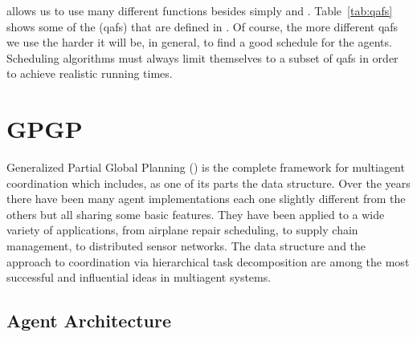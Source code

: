 \taems{} allows us to use many different functions besides simply
 and . Table~\ref{tab:qafs} shows some of the
 (qafs) that are defined in
\taems{}. Of course, the more different qafs we use the harder it
will be, in general, to find a good schedule for the agents.
Scheduling algorithms must always limit themselves to a subset of
qafs in order to achieve realistic running times.

\section{GPGP}

Generalized Partial Global Planning () is the complete framework
for multiagent coordination which includes, as one of its parts the
\taems{} data structure. Over the years there have been many 
agent implementations each one slightly different from the others but
all sharing some basic features.  They have been applied to a wide
variety of applications, from airplane repair scheduling, to supply
chain management, to distributed sensor networks. The \taems{} data
structure and the  approach to coordination via hierarchical task
decomposition are among the most successful and influential ideas in
multiagent systems.

\subsection{Agent Architecture}

